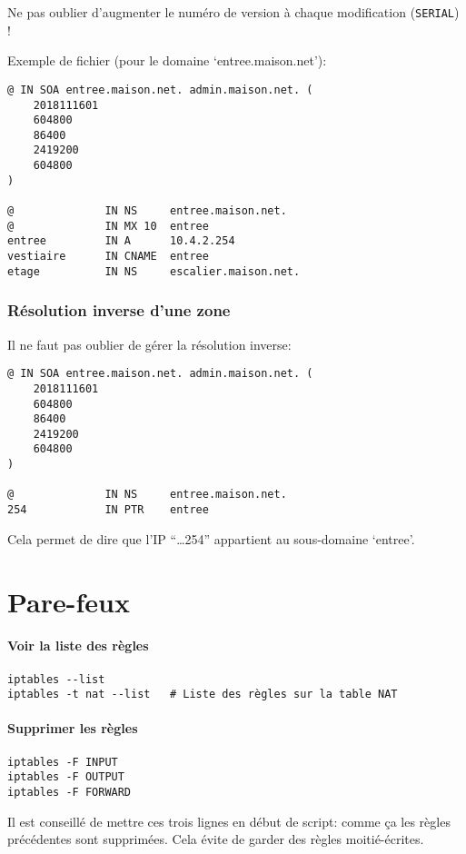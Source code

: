 \documentclass[10pt,a4paper,french]{article}
\begin{document}
Ne pas oublier d'augmenter le numéro de version à chaque modification ({\tt SERIAL}) !

Exemple de fichier (pour le domaine `entree.maison.net'):
\begin{verbatim}
@ IN SOA entree.maison.net. admin.maison.net. (
    2018111601
    604800
    86400
    2419200
    604800
)

@              IN NS     entree.maison.net.
@              IN MX 10  entree
entree         IN A      10.4.2.254
vestiaire      IN CNAME  entree
etage          IN NS     escalier.maison.net.
\end{verbatim}

\subsubsection{Résolution inverse d'une zone}

Il ne faut pas oublier de gérer la résolution inverse:
\begin{verbatim}
@ IN SOA entree.maison.net. admin.maison.net. (
    2018111601
    604800
    86400
    2419200
    604800
)

@              IN NS     entree.maison.net.
254            IN PTR    entree
\end{verbatim}
Cela permet de dire que l'IP ``\ldots 254'' appartient au sous-domaine `entree'.

\section{Pare-feux}

\paragraph{Voir la liste des règles}
\begin{verbatim}
iptables --list
iptables -t nat --list   # Liste des règles sur la table NAT
\end{verbatim}

\paragraph{Supprimer les règles}
\begin{verbatim}
iptables -F INPUT
iptables -F OUTPUT
iptables -F FORWARD
\end{verbatim}

Il est conseillé de mettre ces trois lignes en début de script: comme ça les règles précédentes sont supprimées. Cela évite de garder des règles moitié-écrites.
\end{document}
